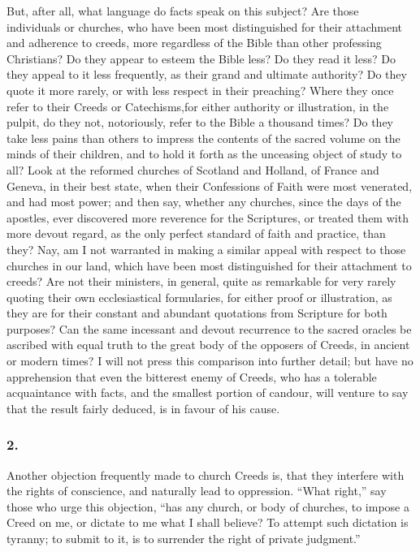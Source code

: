 \documentclass[
]{book}
\begin{document}
But, after all, what language do facts speak on this subject? Are those individuals or churches, who have been most distinguished for their attachment and adherence to creeds, more regardless of the Bible than other professing Christians? Do they appear to esteem the Bible less? Do they read it less? Do they appeal to it less frequently, as their grand and ultimate authority? Do they quote it more rarely, or with less respect in their preaching? Where they once refer to their Creeds or Catechisms,for either authority or illustration, in the pulpit, do they not, notoriously, refer to the Bible a thousand times? Do they take less pains than others to impress the contents of the sacred volume on the minds of their children, and to hold it forth as the unceasing object of study to all? Look at the reformed churches of Scotland and Holland, of France and Geneva, in their best state, when their Confessions of Faith were most venerated, and had most power; and then say, whether any churches, since the days of the apostles, ever discovered more reverence for the Scriptures, or treated them with more devout regard, as the only perfect standard of faith and practice, than they? Nay, am I not warranted in making a similar appeal with respect to those churches in our land, which have been most distinguished for their attachment to creeds? Are not their ministers, in general, quite as remarkable for very rarely quoting their own ecclesiastical formularies, for either proof or illustration, as they are for their constant and abundant quotations from Scripture for both purposes? Can the same incessant and devout recurrence to the sacred oracles be ascribed with equal truth to the great body of the opposers of Creeds, in ancient or modern times? I will not press this comparison into further detail; but have no apprehension that even the bitterest enemy of Creeds, who has a tolerable acquaintance with facts, and the smallest portion of candour, will venture to say that the result fairly deduced, is in favour of his cause.

\hypertarget{section-8}{%
\subsubsection*{2.}\label{section-8}}

Another objection frequently made to church Creeds is, that they interfere with the rights of conscience, and naturally lead to oppression. ``What right,'' say those who urge this objection, ``has any church, or body of churches, to impose a Creed on me, or dictate to me what I shall believe? To attempt such dictation is tyranny; to submit to it, is to surrender the right of private judgment.''
\end{document}
